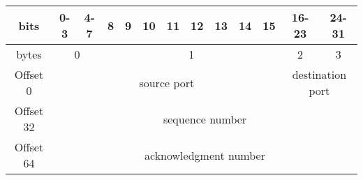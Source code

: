 \begin{table}[H]
	\centering
	\label{tcp-header}
	\begin{tabular}{|c|c|c|c|c|c|c|c|c|c|c|c|c|}
		\hline
		bits       & 0-3                                                   & 4-7      & 8                                                 & 9                                                 & 10                                                & 11                                                & 12                                                & 13                                                & 14                                                & 15                                                & 16-23             & 24-31             \\ \hline
		bytes      & \multicolumn{2}{c|}{0}                                           & \multicolumn{8}{c|}{1}                                                                                                                                                                                                                                                                                                                                                                                                        & 2                 & 3                 \\ \hline
		Offset 0   & \multicolumn{10}{c|}{source port}                                                                                                                                                                                                                                                                                                                                                                                                                                                                & \multicolumn{2}{c|}{destination port} \\ \hline
		Offset 32  & \multicolumn{12}{c|}{sequence number}                                                                                                                                                                                                                                                                                                                                                                                                                                                                                                    \\ \hline
		Offset 64  & \multicolumn{12}{c|}{acknowledgment number}                                                                                                                                                                                                                                                                                                                                                                                                                                                                                             \\ \hline

\end{tabular}
\end{table}
